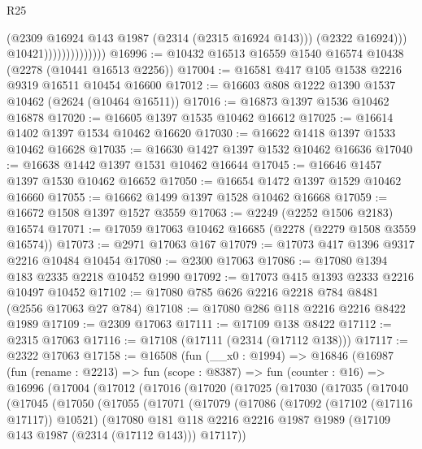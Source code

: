 \begin{lexlean}{R25}
\begin{coremodule}
                                    (@2309 @16924 @143 @1987 (@2314 (@2315 @16924 @143)))
                                    (@2322 @16924)))
                                @10421))))))))))))))
@16996 := @10432 @16513 @16559 @1540 @16574 @10438 (@2278 (@10441 @16513 @2256))
@17004 := @16581 @417 @105 @1538 @2216 @9319 @16511 @10454 @16600
@17012 := @16603 @808 @1222 @1390 @1537 @10462 (@2624 (@10464 @16511))
@17016 := @16873 @1397 @1536 @10462 @16878
@17020 := @16605 @1397 @1535 @10462 @16612
@17025 := @16614 @1402 @1397 @1534 @10462 @16620
@17030 := @16622 @1418 @1397 @1533 @10462 @16628
@17035 := @16630 @1427 @1397 @1532 @10462 @16636
@17040 := @16638 @1442 @1397 @1531 @10462 @16644
@17045 := @16646 @1457 @1397 @1530 @10462 @16652
@17050 := @16654 @1472 @1397 @1529 @10462 @16660
@17055 := @16662 @1499 @1397 @1528 @10462 @16668
@17059 := @16672 @1508 @1397 @1527 @3559
@17063 := @2249 (@2252 @1506 @2183) @16574
@17071 := @17059 @17063 @10462 @16685 (@2278 (@2279 @1508 @3559 @16574))
@17073 := @2971 @17063 @167
@17079 := @17073 @417 @1396 @9317 @2216 @10484 @10454
@17080 := @2300 @17063
@17086 := @17080 @1394 @183 @2335 @2218 @10452 @1990
@17092 := @17073 @415 @1393 @2333 @2216 @10497 @10452
@17102 := @17080 @785 @626 @2216 @2218 @784 @8481 (@2556 @17063 @27 @784)
@17108 := @17080 @286 @118 @2216 @2216 @8422 @1989
@17109 := @2309 @17063
@17111 := @17109 @138 @8422
@17112 := @2315 @17063
@17116 := @17108 (@17111 (@2314 (@17112 @138)))
@17117 := @2322 @17063
@17158 := @16508
    (fun (__x0 : @1994) =>
    @16846
      (@16987
        (fun (rename : @2213) =>
        fun (scope : @8387) =>
        fun (counter : @16) =>
        @16996
          (@17004
            (@17012
              (@17016
                (@17020
                  (@17025
                    (@17030
                      (@17035
                        (@17040
                          (@17045
                            (@17050
                              (@17055
                                (@17071
                                  (@17079
                                    (@17086
                                      (@17092 (@17102 (@17116 @17117)) @10521)
                                      (@17080
                                        @181
                                        @118
                                        @2216
                                        @2216
                                        @1987
                                        @1989
                                        (@17109 @143 @1987 (@2314 (@17112 @143)))
                                        @17117))

\end{coremodule}
\end{lexlean}
